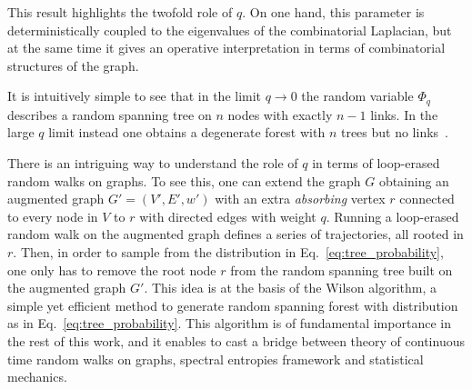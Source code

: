 \documentclass[10pt,aps,pre,twocolumn,nofootinbib,superscriptaddress,longbibliography]{revtex4-1}
\begin{document}
This result highlights the twofold role of $q$. On one hand, this parameter is deterministically coupled to the eigenvalues of the combinatorial Laplacian, but at the same time it gives an operative interpretation in terms of combinatorial structures of the graph.

It is intuitively simple to see that in the limit $q\to 0$ the random variable $\Phi_q$ describes a random spanning tree on $n$ nodes with exactly $n-1$ links. In the large $q$ limit instead one obtains a degenerate forest with $n$ trees but no links~\cite{avena2018}.

There is an intriguing way to understand the role of $q$ in terms of loop-erased random walks on graphs.
To see this, one can extend the graph $G$ obtaining an augmented graph $G'=(V',E',w')$ with an extra \emph{absorbing} vertex $r$ connected to every node in $V$ to $r$ with directed edges with weight $q$.
Running a loop-erased random walk on the augmented graph defines a series of trajectories, all rooted in $r$.
Then, in order to sample from the distribution in Eq.~\ref{eq:tree_probability}, one only has to remove the root node $r$ from the random spanning tree built on the augmented graph $G'$.
This idea is at the basis of the Wilson algorithm, a simple yet efficient method to generate random spanning forest with distribution as in Eq.~\ref{eq:tree_probability}.
This algorithm is of fundamental importance in the rest of this work, and it enables to cast a bridge between theory of continuous time random walks on graphs, spectral entropies framework and statistical mechanics.

% 
\end{document}
